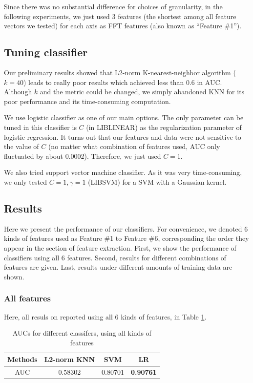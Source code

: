\documentclass{article} %
\begin{document}
Since there was no substantial difference for choices of granularity, in the following experiments, we just used 3 features (the shortest among all feature vectors we tested) for each axis as FFT features (also known as ``Feature \#1'').

\subsection{Tuning classifier}
Our preliminary results showed that L2-norm K-nearest-neighbor algorithm ($k=40$) leads to really poor results which achieved less than 0.6 in AUC. Although $k$ and the metric could be changed, we simply abandoned KNN for its poor performance and its time-consuming computation.

We use logistic classifier as one of our main options. The only parameter can be tuned in this classifier is $C$ (in LIBLINEAR) as the regularization parameter of logistic regression. It turns out that our features and data were not sensitive to the value of $C$ (no matter what combination of features used, AUC only fluctuated by about 0.0002). Therefore, we just used $C=1$.

We also tried support vector machine classifier. As it was very time-consuming, we only tested $C=1, \gamma=1$ (LIBSVM) for a SVM with a Gaussian kernel.

\subsection{Results}

Here we present the performance of our classifiers. For convenience, we denoted 6 kinds of features used as Feature \#1 to Feature \#6, corresponding the order they appear in the section of feature extraction. First, we show the performance of classifiers using all 6 features. Second, results for different combinations of features are given. Last, results under different amounts of training data are shown.

\subsubsection{All features} %
\label{ssub:all_features}
Here, all resuls on reported using all 6 kinds of features, in Table \ref{tbl:test_result}.

\begin{table}[!ht]
\caption{AUCs for different classifers, using all kinds of features}
\label{tbl:test_result}
	\begin{center}
		\begin{tabular}{ c | c  c  c  }
			\hline
			 Methods & L2-norm KNN & SVM & LR \\
			 \hline
			 AUC & 0.58302 & 0.80701 & \textbf{0.90761} \\
			 \hline
		\end{tabular}
	\end{center}
\end{table}
\end{document}
